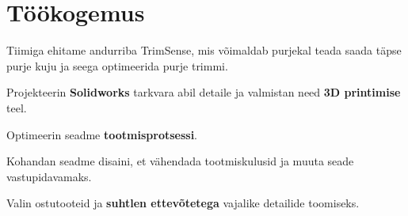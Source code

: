 \documentclass[letterpaper]{deedy-resume} %
\begin{document}
\hfill
%
%
\begin{minipage}[t]{0.66\textwidth} %


\section{Töökogemus}

%
%



\vspace{\topsep} %
\begin{tightitemize}
  \item Tiimiga ehitame andurriba TrimSense, mis võimaldab purjekal teada saada täpse purje kuju ja seega optimeerida purje trimmi.
  \item Projekteerin \textbf{Solidworks} tarkvara abil detaile ja valmistan need \textbf{3D printimise} teel.
  \item Optimeerin seadme \textbf{tootmisprotsessi}.
  \item Kohandan seadme disaini, et vähendada tootmiskulusid ja muuta seade vastupidavamaks.
  \item Valin ostutooteid ja \textbf{suhtlen ettevõtetega} vajalike detailide toomiseks.
\end{tightitemize}


\end{minipage}
\end{document}

